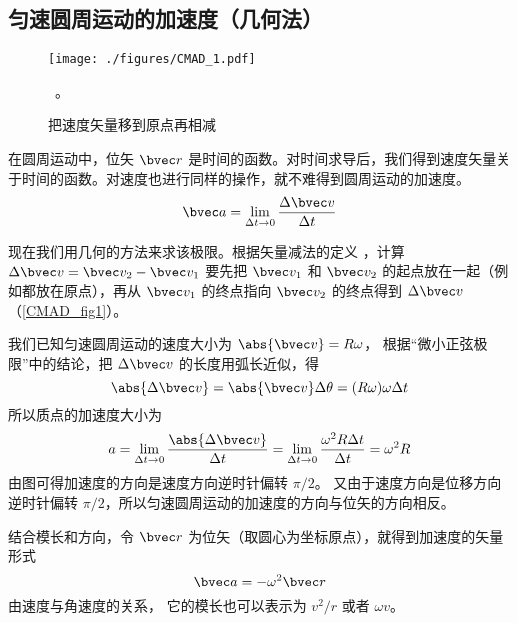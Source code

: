 

\subsection{匀速圆周运动的加速度（几何法）}

\begin{figure}[ht]
\centering
\texttt{[image: ./figures/CMAD\_1.pdf]}
\caption{把速度矢量移到原点再相减}\label{CMAD_fig1}~。
\end{figure}

在圆周运动中，位矢 $\bvec r$ 是时间的函数。对时间求导后，我们得到速度矢量关于时间的函数。对速度也进行同样的操作，就不难得到圆周运动的加速度。
\begin{equation}
\bvec a = \lim_{\Delta t \to 0} \frac{\Delta \bvec v}{\Delta t}
\end{equation}

现在我们用几何的方法来求该极限。根据矢量减法的定义%
，计算 $\Delta \bvec v = \bvec v_2 - \bvec v_1$ 要先把 $\bvec v_1$ 和 $\bvec v_2$ 的起点放在一起（例如都放在原点），再从 $\bvec v_1$ 的终点指向 $\bvec v_2$ 的终点得到 $\Delta \bvec v$ （\autoref{CMAD_fig1}）。 

我们已知匀速圆周运动的速度大小为 $\abs{\bvec v} = R\omega$， 根据“微小正弦极限”中的结论，把 $\Delta\bvec v$ 的长度用弧长近似，得
\begin{equation}
\abs{\Delta \bvec v} = \abs{\bvec v}\Delta \theta  = (R\omega)\omega \Delta t
\end{equation}
所以质点的加速度大小为
\begin{equation}
a =\lim_{\Delta t \to 0} \frac{\abs{\Delta \bvec v}}{\Delta t} =  \lim_{\Delta t \to 0} \frac{\omega ^2 R \Delta t}{\Delta t} = \omega ^2 R
\end{equation}
由图可得加速度的方向是速度方向逆时针偏转 $\pi/2$。 又由于速度方向是位移方向逆时针偏转 $\pi/2$，所以匀速圆周运动的加速度的方向与位矢的方向相反。

结合模长和方向，令 $\bvec r$ 为位矢（取圆心为坐标原点），就得到加速度的矢量形式
\begin{equation}\label{CMAD_eq4}
\bvec a =  - \omega ^2 \bvec r
\end{equation}
由速度与角速度的关系， %
它的模长也可以表示为 $v^2/r$ 或者 $\omega v$。

